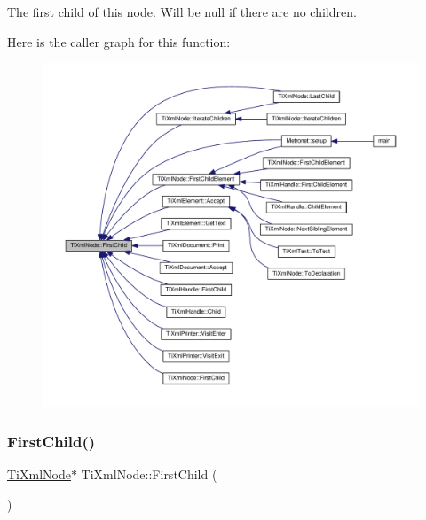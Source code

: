 The first child of this node. Will be null if there are no children. 

Here is the caller graph for this function\+:\nopagebreak
\begin{figure}[H]
\begin{center}
\leavevmode
\includegraphics[width=350pt]{class_ti_xml_node_aa66bceae19707c90c1db12d7c98894a4_icgraph}
\end{center}
\end{figure}
\mbox{\label{class_ti_xml_node_a5e97d69b7c0ebd27fb7286be56559b77}} 
\subsubsection{\texorpdfstring{First\+Child()}{FirstChild()}\hspace{0.1cm}{\footnotesize\ttfamily [2/4]}}
{\footnotesize\ttfamily \hyperlink{class_ti_xml_node}{Ti\+Xml\+Node}$\ast$ Ti\+Xml\+Node\+::\+First\+Child (\begin{DoxyParamCaption}{ }\end{DoxyParamCaption})\hspace{0.3cm}{\ttfamily [inline]}}

